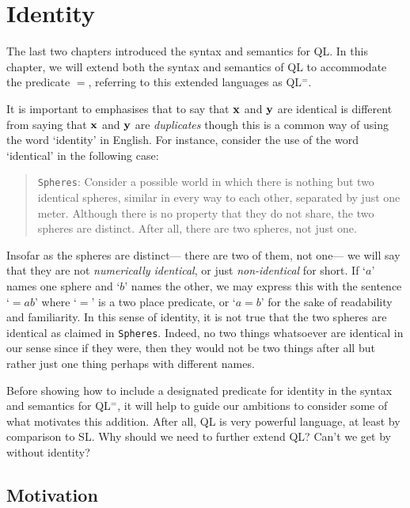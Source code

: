 ﻿%
\chapter{Identity}
\label{ch.identity}

The last two chapters introduced the syntax and semantics for QL.
In this chapter, we will extend both the syntax and semantics of QL to accommodate the  predicate $=$, referring to this extended languages as QL$^=$.

It is important to emphasises that to say that $\mathbf{x}$ and $\mathbf{y}$ are identical is different from saying that $\mathbf{x}$ and $\mathbf{y}$ are \textit{duplicates} though this is a common way of using the word `identity' in English.
For instance, consider the use of the word `identical' in the following case:

  \begin{quote}
    \texttt{Spheres}: Consider a possible world in which there is nothing but two identical spheres, similar in every way to each other, separated by just one meter.
    Although there is no property that they do not share, the two spheres are distinct.
    After all, there are two spheres, not just one.
  \end{quote}

Insofar as the spheres are distinct--- there are two of them, not one--- we will say that they are not \textit{numerically identical}, or just \textit{non-identical} for short.
If `$a$' names one sphere and `$b$' names the other, we may express this with the sentence `${=}ab$' where `$=$' is a two place predicate, or `$a=b$' for the sake of readability and familiarity.
In this sense of identity, it is not true that the two spheres are identical as claimed in \texttt{Spheres}.
Indeed, no two things whatsoever are identical in our sense since if they were, then they would not be two things after all but rather just one thing perhaps with different names.

Before showing how to include a designated predicate for identity in the syntax and semantics for QL$^=$, it will help to guide our ambitions to consider some of what motivates this addition.
After all, QL is very powerful language, at least by comparison to SL.
Why should we need to further extend QL?
Can't we get by without identity?



\section{Motivation}%
  \label{sec:Motivation}

